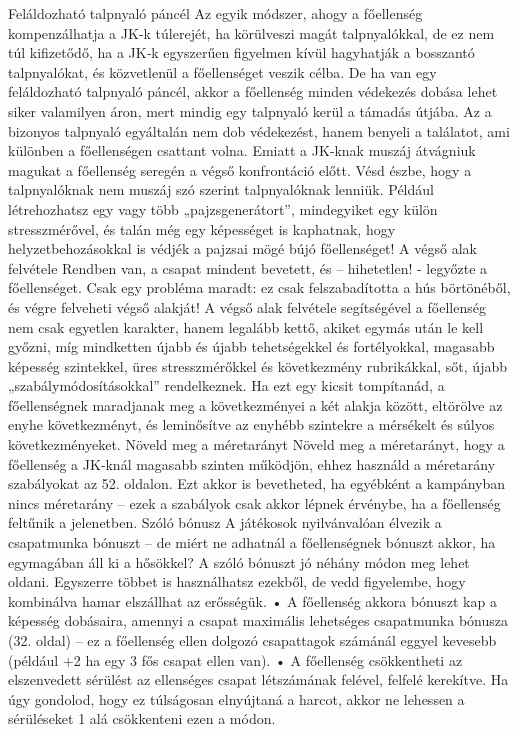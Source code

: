 \documentclass[oneside]{book}
\begin{document}
Feláldozható talpnyaló páncél
Az egyik módszer, ahogy a főellenség kompenzálhatja a JK‑k túlerejét, ha körülveszi magát talpnyalókkal, de ez nem túl kifizetődő, ha a JK‑k egyszerűen figyelmen kívül hagyhatják a bosszantó talpnyalókat, és közvetlenül a főellenséget veszik célba.
De ha van egy feláldozható talpnyaló páncél, akkor a főellenség minden védekezés dobása lehet siker valamilyen áron, mert mindig egy talpnyaló kerül a támadás útjába. Az a bizonyos talpnyaló egyáltalán nem dob védekezést, hanem benyeli a találatot, ami különben a főellenségen csattant volna. Emiatt a JK‑knak muszáj átvágniuk magukat a főellenség seregén a végső konfrontáció előtt.
Vésd észbe, hogy a talpnyalóknak nem muszáj szó szerint talpnyalóknak lenniük. Például létrehozhatsz egy vagy több „pajzsgenerátort”, mindegyiket egy külön stresszmérővel, és talán még egy képességet is kaphatnak, hogy helyzetbehozásokkal is védjék a pajzsai mögé bújó főellenséget!
A végső alak felvétele
Rendben van, a csapat mindent bevetett, és – hihetetlen! - legyőzte a főellenséget. Csak egy probléma maradt: ez csak felszabadította a hús börtönéből, és végre felveheti végső alakját!
A végső alak felvétele segítségével a főellenség nem csak egyetlen karakter, hanem legalább kettő, akiket egymás után le kell győzni, míg mindketten újabb és újabb tehetségekkel és fortélyokkal, magasabb képesség szintekkel, üres stresszmérőkkel és következmény rubrikákkal, sőt, újabb „szabálymódosításokkal” rendelkeznek.
Ha ezt egy kicsit tompítanád, a főellenségnek maradjanak meg a következményei a két alakja között, eltörölve az enyhe következményt, és leminősítve az enyhébb szintekre a mérsékelt és súlyos következményeket.
Növeld meg a méretarányt
Növeld meg a méretarányt, hogy a főellenség a JK‑knál magasabb szinten működjön, ehhez használd a méretarány szabályokat az 52. oldalon. Ezt akkor is bevetheted, ha egyébként a kampányban nincs méretarány – ezek a szabályok csak akkor lépnek érvénybe, ha a főellenség feltűnik a jelenetben.
Szóló bónusz
A játékosok nyilvánvalóan élvezik a csapatmunka bónuszt – de miért ne adhatnál a főellenségnek bónuszt akkor, ha egymagában áll ki a hősökkel?
A szóló bónuszt jó néhány módon meg lehet oldani. Egyszerre többet is használhatsz ezekből, de vedd figyelembe, hogy kombinálva hamar elszállhat az erősségük.
    • A főellenség akkora bónuszt kap a képesség dobásaira, amennyi a csapat maximális lehetséges csapatmunka bónusza (32. oldal) – ez a főellenség ellen dolgozó csapattagok számánál eggyel kevesebb (például +2 ha egy 3 fős csapat ellen van).
    • A főellenség csökkentheti az elszenvedett sérülést az ellenséges csapat létszámának felével, felfelé kerekítve. Ha úgy gondolod, hogy ez túlságosan elnyújtaná a harcot, akkor ne lehessen a sérüléseket 1 alá csökkenteni ezen a módon.
\end{document}
